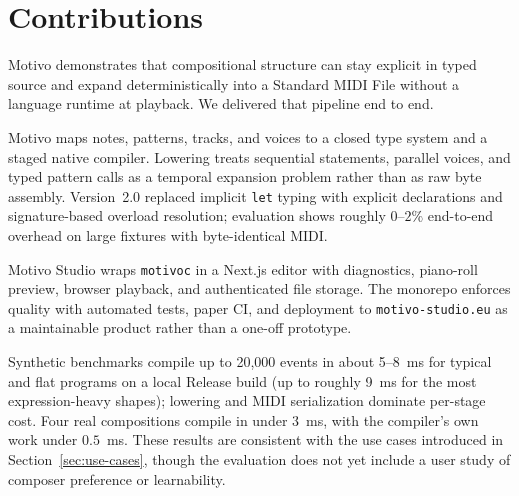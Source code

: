 \section{Contributions}\label{sec:contributions}

Motivo demonstrates that compositional structure can stay explicit in typed source and expand deterministically into a
Standard MIDI File without a language runtime at playback.
We delivered that pipeline end to end.

Motivo maps notes, patterns, tracks, and voices to a closed type system and a staged native compiler.
Lowering treats sequential statements, parallel voices, and typed pattern calls as a temporal expansion problem rather
than as raw byte assembly.
Version~2.0 replaced implicit \texttt{let} typing with explicit declarations and signature-based overload resolution;
evaluation shows roughly $0$--$2\%$ end-to-end overhead on large fixtures with byte-identical MIDI.

Motivo Studio wraps \texttt{motivoc} in a Next.js editor with diagnostics, piano-roll preview, browser playback, and
authenticated file storage.
The monorepo enforces quality with automated tests, paper CI, and deployment to \texttt{motivo-studio.eu} as a
maintainable product rather than a one-off prototype.

Synthetic benchmarks compile up to 20,000 events in about 5--8~ms for typical and flat programs on a local Release
build (up to roughly 9~ms for the most expression-heavy shapes); lowering and MIDI serialization dominate per-stage
cost.
Four real compositions compile in under $3$~ms, with the compiler's own work under $0.5$~ms.
These results are consistent with the use cases introduced in Section~\ref{sec:use-cases},
though the evaluation does not yet include a user study of composer preference or learnability.
